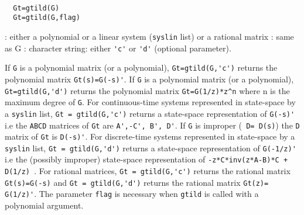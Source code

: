 \begin{mandesc}
   \\ %
\end{mandesc}
\begin{calling_sequence}
\begin{verbatim}
  Gt=gtild(G)  
  Gt=gtild(G,flag)  
\end{verbatim}
\end{calling_sequence}
\begin{parameters}
  \begin{varlist}
    : either a polynomial or a linear system (\verb!syslin! list) or a rational matrix
    : same as G
    : character string: either \verb!'c'! or \verb!'d'! (optional parameter).
  \end{varlist}
\end{parameters}
\begin{mandescription}
  If \verb!G! is a polynomial matrix (or a polynomial), \verb!Gt=gtild(G,'c')!
  returns the polynomial matrix \verb!Gt(s)=G(-s)'!.
  If \verb!G! is a polynomial matrix (or a polynomial),  \verb!Gt=gtild(G,'d')! 
  returns the polynomial matrix \verb!Gt=G(1/z)*z^n! where n is the maximum
  degree of \verb!G!.
  For continuous-time systems represented in state-space by a \verb!syslin! list,
  \verb!Gt = gtild(G,'c')! returns a state-space representation
  of \verb!G(-s)'! i.e the \verb!ABCD! matrices of \verb!Gt! are
  \verb!A',-C', B', D'!. If \verb!G! is improper (\verb! D= D(s)!) 
  the \verb!D! matrix of \verb!Gt! is \verb!D(-s)'!.
  For  discrete-time systems represented in state-space by a \verb!syslin! list,
  \verb!Gt = gtild(G,'d')! returns a state-space representation
  of \verb!G(-1/z)'! i.e the (possibly improper) state-space 
  representation of \verb!-z*C*inv(z*A-B)*C + D(1/z) !.
  For rational matrices, \verb!Gt = gtild(G,'c')! returns the rational
  matrix \verb!Gt(s)=G(-s)! and \verb!Gt = gtild(G,'d')! returns the
  rational matrix \verb!Gt(z)= G(1/z)'!.
  The parameter \verb!flag! is necessary when \verb!gtild! is called with
  a polynomial argument.
\end{mandescription}
